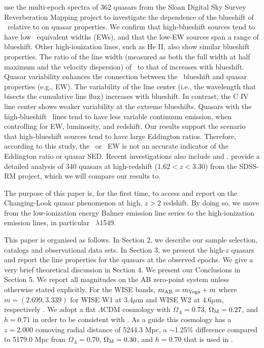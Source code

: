 \documentclass[a4paper,fleqn,usenatbib]{mnras}
\begin{document}
\citet{Sun2018} use the multi-epoch spectra of 362 quasars from the
Sloan Digital Sky Survey Reverberation Mapping project to investigate
the dependence of the blueshift of \civ\ relative to \mgii on quasar
properties. We confirm that high-blueshift sources tend to have low
\civ\ equivalent widths (EWs), and that the low-EW sources span a range
of blueshift. Other high-ionization lines, such as He II, also show
similar blueshift properties. The ratio of the line width (measured as
both the full width at half maximum and the velocity dispersion) of
\civ\ to that of \mgii increases with blueshift. Quasar variability
enhances the connection between the \civ\ blueshift and quasar
properties (e.g., EW). The variability of the \mgii line center (i.e.,
the wavelength that bisects the cumulative line flux) increases with
blueshift. In contrast, the C IV line center shows weaker variability
at the extreme blueshifts. Quasars with the high-blueshift \civ\ lines
tend to have less variable continuum emission, when controlling for
EW, luminosity, and redshift. Our results support the scenario that
high-blueshift sources tend to have large Eddington ratios.
Therefore, according to this study, the \civ\ or \heii\ EW is not an
accurate indicator of the Eddington ratio or quasar SED.
Recent investigations also include \citet{Meyer2019} and \citet{Doan2019}. 
\citet{Dyer2019} provide a detailed analysis of 340 quasars at high-redshift
($1.62<z<3.30$) from the SDSS-RM project, which we will compare our
results to.


The purpose of this paper is, for the first time, to access and 
report on the Changing-Look quasar phenomenon at high, 
$z>2$ redshift. By doing so, we move from the low-ionization 
energy Balmer emission line series to the high-ionization emission 
lines, in particular \civ\ $\lambda$1549. 

This paper is organised as follows. In Section 2, we describe our
sample selection, catalogs and observational data sets.  In Section 3,
we present the high-$z$ quasars and report the line properties for the
quasars at the observed epochs.  We give a very brief theoretical
discussion in Section 4. We present our Conclusions in Section 5.  We
report all magnitudes on the AB zero-point system \citep{Oke_Gunn1983,
Fukugita1996} unless otherwise stated explicitly. For the WISE bands,
$m_{\rm AB} = m_{\rm Vega} + m$ where $m = (2.699, 3.339)$ for WISE W1
at 3.4$\mu$m and WISE W2 at 4.6$\mu$m, respectively
\citep{Cutri2011}.
We adopt a flat $\Lambda$CDM cosmology with $\Omega_{\Lambda} = 0.73$,
$\Omega_{\rm M} = 0.27$, and $h = 0.71$ in order to be consistent with
\citet{Hamann2017}. As a guide this cosmology has a $z=2.000$
comoving radial distance of 5244.3 Mpc, a $\sim$1.25\% difference
compared to 5179.0 Mpc from $\Omega_{\Lambda} = 0.70$, $\Omega_{\rm M}
= 0.30$, and $h = 0.70$ that is used in \citet{Shen2011}.
\end{document}
